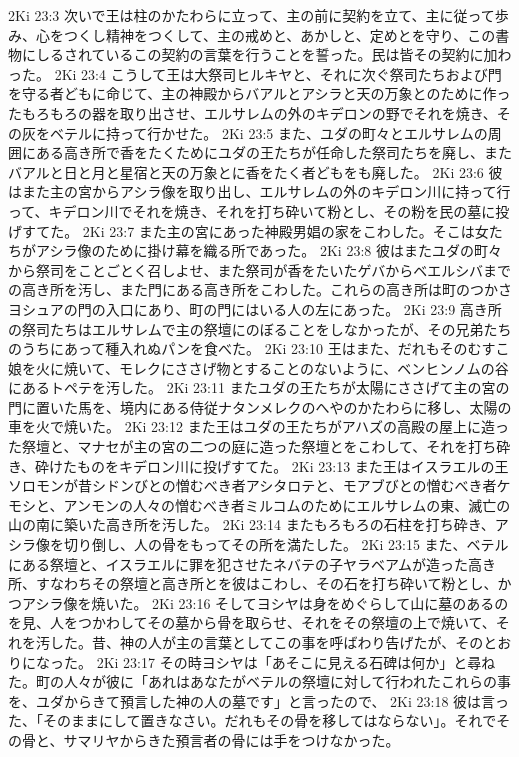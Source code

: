 2Ki 23:3  次いで王は柱のかたわらに立って、主の前に契約を立て、主に従って歩み、心をつくし精神をつくして、主の戒めと、あかしと、定めとを守り、この書物にしるされているこの契約の言葉を行うことを誓った。民は皆その契約に加わった。
2Ki 23:4  こうして王は大祭司ヒルキヤと、それに次ぐ祭司たちおよび門を守る者どもに命じて、主の神殿からバアルとアシラと天の万象とのために作ったもろもろの器を取り出させ、エルサレムの外のキデロンの野でそれを焼き、その灰をベテルに持って行かせた。
2Ki 23:5  また、ユダの町々とエルサレムの周囲にある高き所で香をたくためにユダの王たちが任命した祭司たちを廃し、またバアルと日と月と星宿と天の万象とに香をたく者どもをも廃した。
2Ki 23:6  彼はまた主の宮からアシラ像を取り出し、エルサレムの外のキデロン川に持って行って、キデロン川でそれを焼き、それを打ち砕いて粉とし、その粉を民の墓に投げすてた。
2Ki 23:7  また主の宮にあった神殿男娼の家をこわした。そこは女たちがアシラ像のために掛け幕を織る所であった。
2Ki 23:8  彼はまたユダの町々から祭司をことごとく召しよせ、また祭司が香をたいたゲバからベエルシバまでの高き所を汚し、また門にある高き所をこわした。これらの高き所は町のつかさヨシュアの門の入口にあり、町の門にはいる人の左にあった。
2Ki 23:9  高き所の祭司たちはエルサレムで主の祭壇にのぼることをしなかったが、その兄弟たちのうちにあって種入れぬパンを食べた。
2Ki 23:10  王はまた、だれもそのむすこ娘を火に焼いて、モレクにささげ物とすることのないように、ベンヒンノムの谷にあるトペテを汚した。
2Ki 23:11  またユダの王たちが太陽にささげて主の宮の門に置いた馬を、境内にある侍従ナタンメレクのへやのかたわらに移し、太陽の車を火で焼いた。
2Ki 23:12  また王はユダの王たちがアハズの高殿の屋上に造った祭壇と、マナセが主の宮の二つの庭に造った祭壇とをこわして、それを打ち砕き、砕けたものをキデロン川に投げすてた。
2Ki 23:13  また王はイスラエルの王ソロモンが昔シドンびとの憎むべき者アシタロテと、モアブびとの憎むべき者ケモシと、アンモンの人々の憎むべき者ミルコムのためにエルサレムの東、滅亡の山の南に築いた高き所を汚した。
2Ki 23:14  またもろもろの石柱を打ち砕き、アシラ像を切り倒し、人の骨をもってその所を満たした。
2Ki 23:15  また、ベテルにある祭壇と、イスラエルに罪を犯させたネバテの子ヤラベアムが造った高き所、すなわちその祭壇と高き所とを彼はこわし、その石を打ち砕いて粉とし、かつアシラ像を焼いた。
2Ki 23:16  そしてヨシヤは身をめぐらして山に墓のあるのを見、人をつかわしてその墓から骨を取らせ、それをその祭壇の上で焼いて、それを汚した。昔、神の人が主の言葉としてこの事を呼ばわり告げたが、そのとおりになった。
2Ki 23:17  その時ヨシヤは「あそこに見える石碑は何か」と尋ねた。町の人々が彼に「あれはあなたがベテルの祭壇に対して行われたこれらの事を、ユダからきて預言した神の人の墓です」と言ったので、
2Ki 23:18  彼は言った、「そのままにして置きなさい。だれもその骨を移してはならない」。それでその骨と、サマリヤからきた預言者の骨には手をつけなかった。
